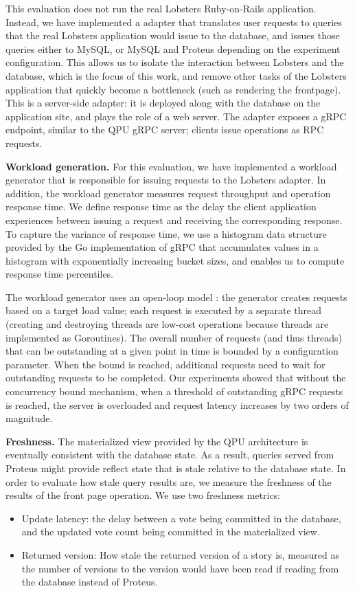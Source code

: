 This evaluation does not run the real Lobsters Ruby-on-Rails application.
Instead, we have implemented a adapter that translates user requests to queries that the real
Lobsters application would issue to the database,
and issues those queries either to MySQL, or MySQL and Proteus depending on the experiment configuration.
This allows us to isolate the interaction between Lobsters and the database, which is the focus of this work,
and remove other tasks of the Lobsters application that quickly become a bottleneck (such as rendering the frontpage).
This is a server-side adapter: it is deployed along with the database on the application site,
and plays the role of a web server.
The adapter exposes a gRPC endpoint, similar to the QPU gRPC server; clients issue operations as RPC requests.

\bigskip
\noindent
\textbf{Workload generation.}
For this evaluation, we have implemented a workload generator \cite{lobsters:bench} that is responsible for issuing
requests to the Lobsters adapter.
In addition, the workload generator measures request throughput and operation response time.
We define response time as the delay the client application experiences between issuing a request and receiving the
corresponding response.
To capture the variance of response time, we use a histogram data structure provided by the Go implementation of gRPC \cite{grpcgo:histogram}
that accumulates values in a histogram with exponentially increasing bucket sizes, and enables us to compute response time percentiles.

The workload generator uses an open-loop model \cite{schroeder:cautionarytale}:
the generator creates requests based on a target load value;
each request is executed by a separate thread (creating and destroying threads are low-cost operations because threads are
implemented as Goroutines).
The overall number of requests (and thus threads) that can be outstanding at a given point in time is bounded by a
configuration parameter.
When the bound is reached, additional requests need to wait for outstanding requests to be completed.
Our experiments showed that without the concurrency bound mechanism, when a threshold of outstanding gRPC requests is reached,
the server is overloaded and request latency increases by two orders of magnitude.

\bigskip
\noindent
\textbf{Freshness.} The materialized view provided by the QPU architecture is eventually consistent with the database state.
As a result, queries served from Proteus might provide reflect state that is stale relative to the database state.
In order to evaluate how stale query results are, we measure the freshness of the results of the front page operation.
We use two freshness metrics:
\begin{itemize}
  \item Update latency: the delay between a vote being committed in the database, and the updated vote count being committed
  in the materialized view.
  \item Returned version: How stale the returned version of a story is, measured as the number of versions to the version
  would have been read if reading from the database instead of Proteus.
\end{itemize}

